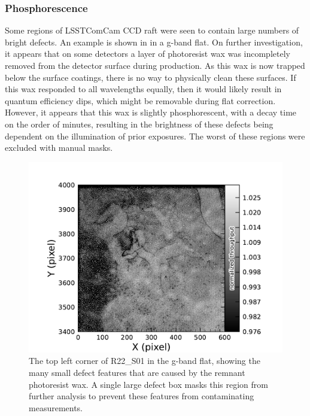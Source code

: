 \subsubsection{Phosphorescence}
Some regions of LSSTComCam CCD raft were seen to contain large numbers of bright defects.
An example is shown in    in a g-band flat. 
On further investigation, it appears that on some detectors a layer of photoresist wax was incompletely removed from the detector surface during production.
As this wax is now trapped below the surface coatings, there is no way to physically clean these surfaces.
If this wax responded to all wavelengths equally, then it would likely result in quantum efficiency dips, which might be removable during flat correction.
However, it appears that this wax is slightly phosphorescent, with a decay time on the order of minutes, resulting in the brightness of these defects being dependent on the illumination of prior exposures.
The worst of these regions were excluded with manual masks.
\begin{figure}[htb!]
  \centering
  \includegraphics[width=0.98\linewidth]{figures/dp1_isr_anomalies-phosphorescence.pdf}
  \caption{The top left corner of R22\_S01 in the g-band flat, showing the many small defect features that are caused by the remnant photoresist wax.
  A single large defect box masks this region from further analysis to prevent these features from contaminating measurements.}
  \label{fig:anomalies_phosphorescence}
\end{figure}

